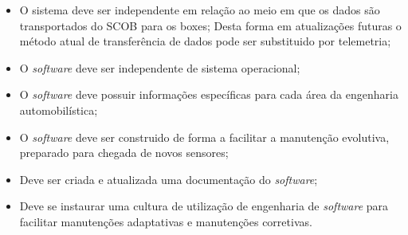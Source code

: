 \begin{itemize}[label={-}]
	\item O sistema deve ser independente em relação ao meio em que os dados são transportados do SCOB para os boxes; Desta forma em atualizações futuras o método atual de transferência de dados pode ser substituido por telemetria;
	\item O \textit{software} deve ser independente de sistema operacional;
	\item O \textit{software} deve possuir informações específicas para cada área da engenharia automobilística;
	\item O \textit{software} deve ser construido de forma a facilitar a manutenção evolutiva, preparado para chegada de novos sensores;
	\item Deve ser criada e atualizada uma documentação do \textit{software};
	\item Deve se instaurar uma cultura de utilização de engenharia de \textit{software} para facilitar manutenções adaptativas e manutenções corretivas.
\end{itemize}

